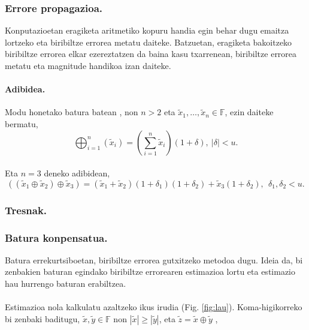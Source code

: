\subsubsection*{Errore propagazioa.}

Konputazioetan eragiketa aritmetiko kopuru handia egin behar dugu emaitza lortzeko eta biribiltze errorea metatu daiteke. Batzuetan, eragiketa bakoitzeko biribiltze errorea elkar ezereztatzen da baina kasu txarrenean, biribiltze errorea metatu eta magnitude handikoa izan daiteke.   

\paragraph*{\textbf{Adibidea}.} 
Modu honetako batura batean , non $n>2$ eta $\tilde x_1,\dots,\tilde x_n \in \mathbb{F}$,  ezin daiteke bermatu,  
\begin{equation*}
\bigoplus_{i=1}^{n}(\tilde x_i)=(\sum\limits_{i=1}^{n} \tilde x_i)(1+\delta), \ |\delta|<u.
\end{equation*}

\paragraph*{}Eta $n=3$ deneko adibidean,
\begin{equation*}
((\tilde x_1 \oplus \tilde x_2) \oplus \tilde x_3)  = 
  (\tilde x_1 + \tilde x_2)(1+\delta_1)(1+\delta_2)
  +\tilde x_3 (1+\delta_2), \ \ \delta_1,\delta_2<u.
\end{equation*}

\subsubsection{Tresnak.}
\subsubsection*{Batura konpensatua.}
   
Batura errekurtsiboetan, biribiltze errorea gutxitzeko metodoa dugu.
Ideia da, bi zenbakien baturan egindako biribiltze errorearen estimazioa lortu eta estimazio hau hurrengo baturan erabiltzea.

\paragraph*{} Estimazioa nola kalkulatu azaltzeko ikus irudia (Fig. \ref{fig:lau}). Koma-higikorreko bi zenbaki baditugu, $\tilde x,\tilde y \in \mathbb{F}$ non $|\tilde x| \geq |\tilde y|$, eta $\tilde z= \tilde x \oplus \tilde y$ ,

